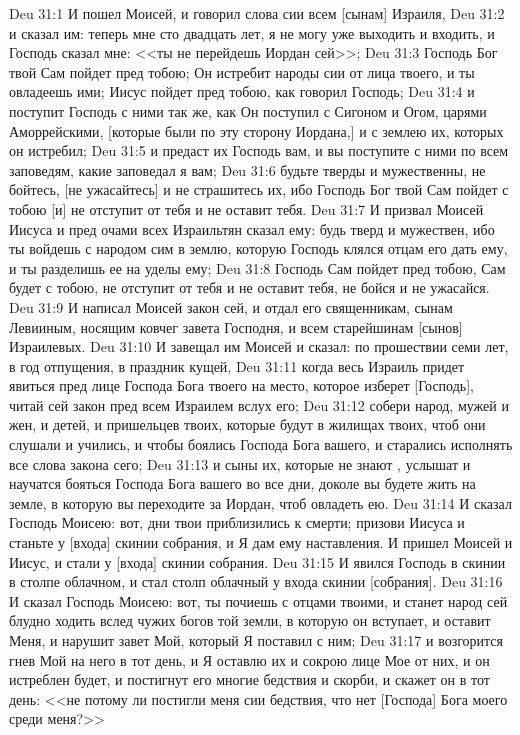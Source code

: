 \vs Deu 31:1 И пошел Моисей, и говорил слова сии всем [сынам] Израиля,
\vs Deu 31:2 и сказал им: теперь мне сто двадцать лет, я не могу уже выходить и входить, и Господь сказал мне: <<ты не перейдешь Иордан сей>>;
\vs Deu 31:3 Господь Бог твой Сам пойдет пред тобою; Он истребит народы сии от лица твоего, и ты овладеешь ими; Иисус пойдет пред тобою, как говорил Господь;
\vs Deu 31:4 и поступит Господь с ними так же, как Он поступил с Сигоном и Огом, царями Аморрейскими, [которые были по эту сторону Иордана,] и с землею их, которых он истребил;
\vs Deu 31:5 и предаст их Господь вам, и вы поступите с ними по всем заповедям, какие заповедал я вам;
\vs Deu 31:6 будьте тверды и мужественны, не бойтесь, [не ужасайтесь] и не страшитесь их, ибо Господь Бог твой Сам пойдет с тобою [и] не отступит от тебя и не оставит тебя.
\rsbpar\vs Deu 31:7 И призвал Моисей Иисуса и пред очами всех Израильтян сказал ему: будь тверд и мужествен, ибо ты войдешь с народом сим в землю, которую Господь клялся отцам его дать ему, и ты разделишь ее на уделы ему;
\vs Deu 31:8 Господь Сам пойдет пред тобою, Сам будет с тобою, не отступит от тебя и не оставит тебя, не бойся и не ужасайся.
\vs Deu 31:9 И написал Моисей закон сей, и отдал его священникам, сынам Левииным, носящим ковчег завета Господня, и всем старейшинам [сынов] Израилевых.
\vs Deu 31:10 И завещал им Моисей и сказал: по прошествии семи лет, в год отпущения, в праздник кущей,
\vs Deu 31:11 когда весь Израиль придет явиться пред лице Господа Бога твоего на место, которое изберет [Господь], читай сей закон пред всем Израилем вслух его;
\vs Deu 31:12 собери народ, мужей и жен, и детей, и пришельцев твоих, которые будут в жилищах твоих, чтоб они слушали и учились, и чтобы боялись Господа Бога вашего, и старались исполнять все слова закона сего;
\vs Deu 31:13 и сыны их, которые не знают , услышат и научатся бояться Господа Бога вашего во все дни, доколе вы будете жить на земле, в которую вы переходите за Иордан, чтоб овладеть ею.
\rsbpar\vs Deu 31:14 И сказал Господь Моисею: вот, дни твои приблизились к смерти; призови Иисуса и станьте у [входа] скинии собрания, и Я дам ему наставления. И пришел Моисей и Иисус, и стали у [входа] скинии собрания.
\vs Deu 31:15 И явился Господь в скинии в столпе облачном, и стал столп облачный у входа скинии [собрания].
\vs Deu 31:16 И сказал Господь Моисею: вот, ты почиешь с отцами твоими, и станет народ сей блудно ходить вслед чужих богов той земли, в которую он вступает, и оставит Меня, и нарушит завет Мой, который Я поставил с ним;
\vs Deu 31:17 и возгорится гнев Мой на него в тот день, и Я оставлю их и сокрою лице Мое от них, и он истреблен будет, и постигнут его многие бедствия и скорби, и скажет он в тот день: <<не потому ли постигли меня сии бедствия, что нет [Господа] Бога моего среди меня?>>
